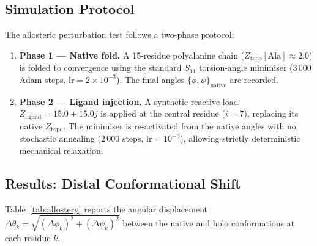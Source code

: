 \subsection{Simulation Protocol}
\label{sec:allostery_protocol}

The allosteric perturbation test follows a two-phase protocol:

\begin{enumerate}
    \item \textbf{Phase 1 --- Native fold.}  A 15-residue polyalanine
          chain ($Z_\text{topo}[\text{Ala}] \approx 2.0$) is folded to
          convergence using the standard $S_{11}$ torsion-angle
          minimiser (3\,000 Adam steps, $\text{lr} = 2 \times 10^{-3}$).
          The final angles $\{\phi, \psi\}_\text{native}$ are recorded.
    \item \textbf{Phase 2 --- Ligand injection.}  A synthetic reactive
          load $Z_\text{ligand} = 15.0 + 15.0j$ is applied at the
          central residue ($i = 7$), replacing its native
          $Z_\text{topo}$.  The minimiser is re-activated from the
          native angles with no stochastic annealing (2\,000 steps,
          $\text{lr} = 10^{-3}$), allowing strictly deterministic
          mechanical relaxation.
\end{enumerate}

\subsection{Results: Distal Conformational Shift}
\label{sec:allostery_results}

Table~\ref{tab:allostery} reports the angular displacement
$\Delta\theta_k = \sqrt{(\Delta\phi_k)^2 + (\Delta\psi_k)^2}$ between
the native and holo conformations at each residue $k$.

